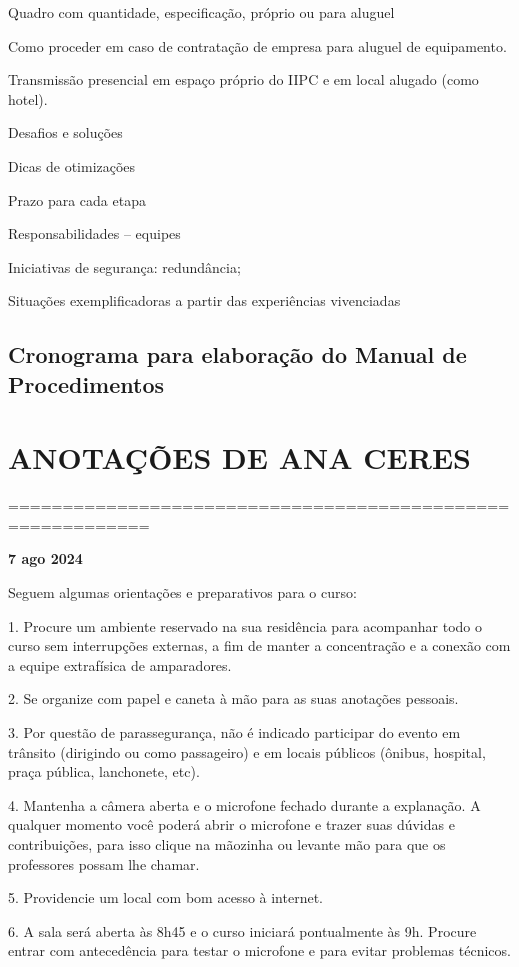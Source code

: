\documentclass[
]{book}
\begin{document}
Quadro com quantidade, especificação, próprio ou para aluguel

Como proceder em caso de contratação de empresa para aluguel de
equipamento.

Transmissão presencial em espaço próprio do IIPC e em local alugado
(como hotel).

Desafios e soluções

Dicas de otimizações

Prazo para cada etapa

Responsabilidades -- equipes

Iniciativas de segurança: redundância;

Situações exemplificadoras a partir das experiências vivenciadas

\chapter{Cronograma para elaboração do Manual de
Procedimentos}\label{cronograma-para-elaborauxe7uxe3o-do-manual-de-procedimentos}

\part{ANOTAÇÕES DE ANA CERES}\label{anotauxe7uxf5es-de-ana-ceres}

===========================================================

\textbf{7 ago 2024}

Seguem algumas orientações e preparativos para o curso:

1. Procure um ambiente reservado na sua residência para acompanhar todo
o curso sem interrupções externas, a fim de manter a concentração e a
conexão com a equipe extrafísica de amparadores.

2. Se organize com papel e caneta à mão para as suas anotações pessoais.

3. Por questão de parassegurança, não é indicado participar do evento em
trânsito (dirigindo ou como passageiro) e em locais públicos (ônibus,
hospital, praça pública, lanchonete, etc).

4. Mantenha a câmera aberta e o microfone fechado durante a explanação.
A qualquer momento você poderá abrir o microfone e trazer suas dúvidas e
contribuições, para isso clique na mãozinha ou levante mão para que os
professores possam lhe chamar.

5. Providencie um local com bom acesso à internet.

6. A sala será aberta às 8h45 e o curso iniciará pontualmente às 9h.
Procure entrar com antecedência para testar o microfone e para evitar
problemas técnicos.
\end{document}
